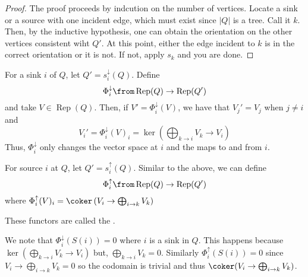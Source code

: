 \documentclass[11pt,leqno,oneside]{amsbook}
\numberwithin{thm}{section}
\newcommand{\Rep}{\operatorname{Rep}} %
\renewcommand{\Q}{Q} %
\newcommand{\sinktosource}{s^\downarrow} %
\newcommand{\sourcetosink}{s^\uparrow} %
\newcommand{\sinktosourcefunc}{\Phi^\downarrow} %
\newcommand{\sourcetosinkfunc}{\Phi^\uparrow} %
\begin{document}
\begin{proof}
  The proof proceeds by indcution on the number of vertices. Locate a
  sink or a source with one incident edge, which must exist since
  \(|\Q|\) is a tree. Call it 
  \(k\). Then,
  by the inductive hypothesis, one can obtain the orientation on the
  other vertices consistent wiht \(\Q'\). At this point, either the
  edge incident to \(k\) is in the correct orientation or it is
  not. If not, apply \(s_k\) and you are done.
\end{proof}
\begin{defn}
  For a sink \(i\) of \(\Q\), let \(\Q' =
  \sinktosource_i(\Q)\). Define \[
    \sinktosourcefunc_i \from \Rep(\Q) \to \Rep(\Q')
  \]
  and take \(V \in \Rep(\Q)\). Then, if \(V' = \sinktosourcefunc_i(V)\),
  we have that \(V_j' = V_j\) when \(j \neq i\) and \[
    V_i' = \sinktosourcefunc_i(V)_i = \ker\left( \bigoplus_{k \to i}
      V_k \to V_i \right)
  \]
  Thus, \(\sinktosourcefunc_i\) only changes the vector space at \(i\)
  and the maps to and from \(i\). 
\end{defn}
\begin{defn}
  For source \(i\) at \(\Q\), let \(\Q' =
  \sourcetosink_i(\Q)\). Similar to the above, we can define \[
    \sourcetosinkfunc_i \from \Rep(\Q) \to \Rep(\Q')
  \]
  where \(\sourcetosinkfunc_i(V)_i = \coker \left( V_i \to \bigoplus_{i
      \to k} V_k \right)\)
\end{defn}
\begin{rmk}
  These functors are called the .
\end{rmk}
\begin{example}
  We note that \(\sinktosourcefunc_i(S(i)) =
  0\) where \(i\) is a sink in \(\Q\). This happens because \(\ker
  \left( \bigoplus_{k \to i} V_k \to 
    V_i \right)\) but, \(\bigoplus_{k \to i} V_k = 0\). Similarly
  \(\sourcetosinkfunc_i(S(i)) = 0\) since \(V_i \to \bigoplus_{i \to
    k} V_k = 0\) so the codomain is trivial and thus \(\coker(V_i \to
  \bigoplus_{i \to k} V_k)\). 
\end{example}
\end{document}

